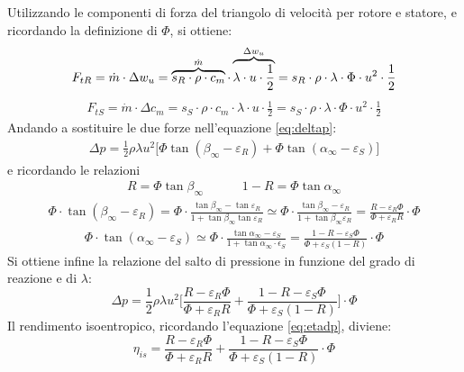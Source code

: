 Utilizzando le componenti di forza del triangolo di velocità per rotore e statore, e ricordando la definizione di $\Phi$, si ottiene:
\begin{align*}
F_{tR} = \dot{m} \cdot \Delta w_u = \overbrace{s_R \cdot \rho \cdot c_m}^\text{$ \dot{m} $} \cdot \overbrace{\lambda \cdot u \cdot \frac{1}{2}}^\text{$\Delta w_u$}=  s_R \cdot \rho \cdot \lambda \cdot \Phi \cdot u^2 \cdot \frac{1}{2}
\end{align*}
\begin{align*}
F_{tS} = \dot{m} \cdot \Delta c_m = s_S \cdot \rho \cdot c_m \cdot \lambda \cdot u \cdot \frac{1}{2} =s_S \cdot \rho \cdot \lambda \cdot \Phi \cdot u^2 \cdot \frac{1}{2}
\end{align*}
Andando a sostituire le due forze nell'equazione \ref{eq:deltap}:
\begin{align*}
\Delta p = \frac{1}{2} \rho \lambda u^2 \big[\Phi \tan \left( \beta_{\infty} - \varepsilon_R \right) + \Phi \tan \left( \alpha_{\infty} - \varepsilon_S \right) \big]
\end{align*}
e ricordando le relazioni
\begin{align*}
R = \Phi \tan \beta_{\infty} \;\;\;\;\;\;\;\;\;\;\; 1 - R = \Phi \tan \alpha_{\infty} 
\end{align*}
\begin{align*}
\Phi \cdot \tan ( \beta_{\infty} - \varepsilon_R ) = \Phi \cdot \frac{\tan \beta_{\infty} - \tan \varepsilon_R}{1 + \tan \beta_{\infty} \tan \varepsilon_R} \simeq \Phi \cdot \frac{\tan \beta_{\infty} - \varepsilon_R}{1 + \tan \beta_{\infty} \varepsilon_R}= \frac{R - \varepsilon_R \Phi}{\Phi + \varepsilon_R R}  \cdot \Phi
\end{align*}
\begin{align*}
\Phi \cdot \tan (\alpha_{\infty} - \varepsilon_S) \simeq \Phi \cdot \frac{\tan \alpha_{\infty} - \varepsilon_S}{1 + \tan \alpha_{\infty} \cdot \epsilon_S} = \frac{1 - R - \varepsilon_S \Phi}{\Phi + \varepsilon_S (1-R)} \cdot \Phi
\end{align*}
Si ottiene infine la relazione del salto di pressione in funzione del grado di reazione e di $\lambda$:
\begin{equation}
\Delta p = \frac{1}{2} \rho \lambda u^2 \Bigg[ \frac{R - \varepsilon_R \Phi}{\Phi + \varepsilon_R R} + \frac{1 - R - \varepsilon_S \Phi}{\Phi + \varepsilon_S (1-R)} \Bigg] \cdot \Phi
\end{equation}
Il rendimento isoentropico, ricordando l'equazione \ref{eq:etadp}, diviene:
\begin{equation}
\boxed{ \eta_{is} = \frac{R - \varepsilon_R \Phi}{\Phi + \varepsilon_R R} + \frac{1 - R - \varepsilon_S \Phi}{\Phi + \varepsilon_S (1-R)} } \cdot \Phi
\end{equation}

